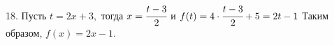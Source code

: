18. Пусть $t=2x+3,$ тогда $x=\cfrac{t-3}{2}$ и $f(t)=4\cdot\cfrac{t-3}{2}+5=2t-1$ Таким образом, $f(x)=2x-1.$\\
